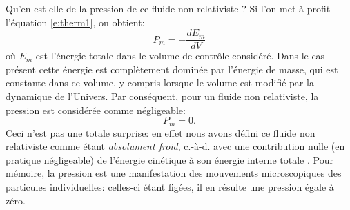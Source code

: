 Qu'en est-elle de la pression de ce fluide non relativiste ? Si l'on met à profit l'équation \ref{e:therm1}, on obtient:
\begin{equation}
P_m=-\frac{dE_m}{dV}
\end{equation}
où $E_m$ est l'énergie totale dans le volume de contrôle considéré. Dans le cas présent cette énergie est complètement dominée par l'énergie de masse, qui est constante dans ce volume, y compris lorsque le volume est modifié par la dynamique de l'Univers. Par conséquent, pour un fluide non relativiste, la pression est considérée comme négligeable:
\begin{equation}
P_m=0.
\end{equation}
Ceci n'est pas une totale surprise: en effet nous avons défini ce fluide non relativiste comme étant \textit{absolument froid}, c.-à-d. avec une contribution nulle (en pratique négligeable) de l'énergie cinétique à son énergie interne totale . Pour mémoire, la pression est une manifestation des mouvements microscopiques des particules individuelles: celles-ci étant figées, il en résulte une pression égale à zéro.

